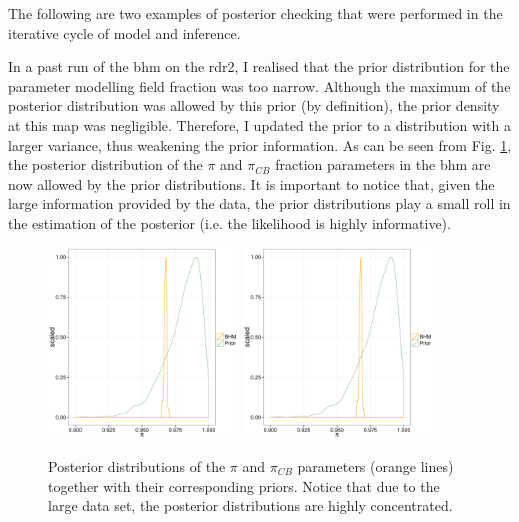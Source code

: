 The following are two examples of posterior checking that were performed in the iterative cycle of model and inference. 

In a past run of the \gls{bhm} on the \gls{rdr2}, I realised that the prior distribution for the parameter modelling field fraction was too narrow. Although the maximum of the posterior distribution was allowed by this prior (by definition), the prior density at this \gls{map} was negligible. Therefore, I updated the prior to a distribution with a larger variance, thus weakening the prior information. As can be seen from Fig. \ref{fig:fractions}, the posterior distribution of the $\pi$ and $\pi_{CB}$ fraction parameters in the \gls{bhm} are now allowed by the prior distributions. It is important to notice that, given the large information provided by the data, the prior distributions play a small roll in the estimation of the posterior (i.e. the likelihood is highly informative). 

\begin{figure}[ht!]
\begin{center}
\includegraphics[page=1,width=0.45\textwidth]{background/Figures/BHM/Fractions.pdf}
\includegraphics[page=2,width=0.45\textwidth]{background/Figures/BHM/Fractions.pdf}
\caption{Posterior distributions of the $\pi$ and $\pi_{CB}$ parameters (orange lines) together with their corresponding priors. Notice that due to the large data set, the posterior distributions are highly concentrated.}
\label{fig:fractions}
\end{center}
\end{figure}


